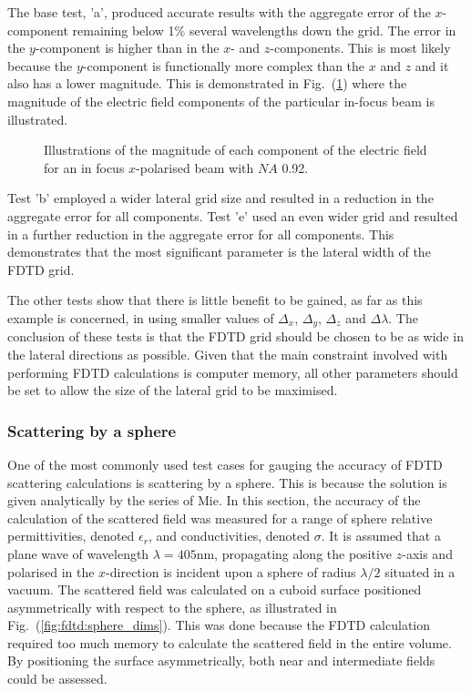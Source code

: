\documentclass[a4paper, 12pt]{article}
\newcommand{\rfig}[1]{Fig.\ (\ref{#1})}
\begin{document}
	The base test, 'a', produced accurate results with the aggregate error
	of the $x$-component
	remaining below 1\% several wavelengths down the grid. The error in
	the $y$-component is higher than in the $x$- and $z$-components. This
	is most likely because the $y$-component is functionally more complex
	than the $x$ and $z$ and it also has a lower magnitude. This is
	demonstrated in \rfig{fig:fdtd:rw_field} where the magnitude of the electric field
	components of the particular in-focus beam is illustrated. 
	\begin{figure}[!h]
		\centering
		\caption{Illustrations of the magnitude of each component of the
			electric field for an in focus $x$-polarised beam with $NA$ 0.92.}
		\label{fig:fdtd:rw_field}
	\end{figure}
	
	Test 'b' employed a wider lateral grid size and resulted in a
	reduction in the aggregate error for all components. Test 'e' used an
	even wider grid and resulted in a further reduction in the aggregate
	error for all components. This demonstrates that the most significant
	parameter is the lateral width of the FDTD grid. 
	
	The other tests show that there is little benefit to be gained, as far
	as this example is concerned, in using smaller values of $\Delta_x$,
	$\Delta_y$, $\Delta_z$ and $\Delta\lambda$. The conclusion of these
	tests is that the FDTD grid should be chosen to be as wide in the
	lateral directions as possible. Given that the main constraint
	involved with performing FDTD calculations is computer memory, all
	other parameters should be set to allow the size of the lateral grid
	to be maximised.  
	
	\subsubsection{Scattering by a sphere}
	One of the most commonly used test cases for gauging the accuracy of
	FDTD scattering calculations is scattering by a sphere. This is
	because the solution is given analytically by the series of Mie. In this section, the accuracy of the calculation
	of the scattered field was measured for a range of sphere relative
	permittivities, denoted $\epsilon_r$, and conductivities, denoted
	$\sigma$. It is assumed that a plane wave of wavelength $\lambda=405$nm, propagating along the
	positive $z$-axis and polarised in the $x$-direction is incident upon
	a sphere of radius $\lambda/2$ situated in a vacuum. The scattered field was calculated on
	a cuboid surface positioned asymmetrically with respect to the sphere,
	as illustrated in \rfig{fig:fdtd:sphere_dims}. This was done because
	the FDTD calculation required too much memory to calculate the scattered field in the
	entire volume. By positioning the surface asymmetrically, both near
	and intermediate fields could be assessed. 
	
\end{document}
